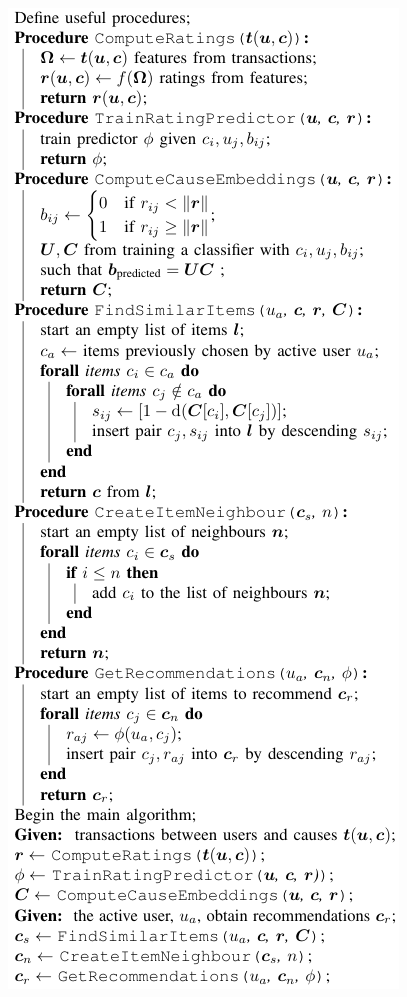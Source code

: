     \begin{minipage}{.5\textwidth}
        \includegraphics[scale=0.4,trim=0 0 0 78ex,clip]{GraphicFiles/itembasedCF.png}
    \end{minipage}
    
